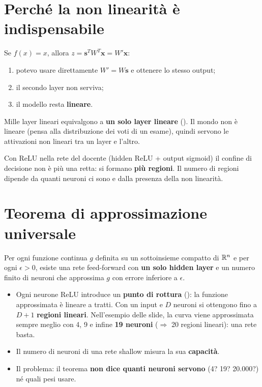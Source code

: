 \section{Perché la non linearità è indispensabile}
Se $f(x)=x$, allora $z = \mathbf{s}^T W^T \mathbf{x} = W'\mathbf{x}$:
\begin{enumerate}
  \item potevo usare direttamente $W' = W\mathbf{s}$ e ottenere lo stesso output;
  \item il secondo layer non serviva;
  \item il modello resta \textbf{lineare}.
\end{enumerate}
Mille layer lineari equivalgono a \textbf{un solo layer lineare} (). Il mondo non è lineare (pensa alla
distribuzione dei voti di un esame), quindi servono le attivazioni non lineari tra un layer e l'altro.

Con ReLU nella rete del docente (hidden ReLU + output sigmoid) il confine di decisione non è più una retta: si formano
\textbf{più regioni}. Il numero di regioni dipende da quanti neuroni ci sono e dalla presenza della non linearità.

\section{Teorema di approssimazione universale}
\begin{definizione}
Per ogni funzione continua $g$ definita su un sottoinsieme compatto di $\mathbb{R}^n$ e per ogni $\epsilon > 0$, esiste una
rete feed-forward con \textbf{un solo hidden layer} e un numero finito di neuroni che approssima $g$ con errore inferiore a $\epsilon$.
\end{definizione}
\begin{itemize}
  \item Ogni neurone ReLU introduce un \textbf{punto di rottura} (): la funzione approssimata è lineare a tratti.
        Con un input e $D$ neuroni si ottengono fino a $D+1$ \textbf{regioni lineari}. Nell'esempio delle slide, la curva viene
        approssimata sempre meglio con 4, 9 e infine \textbf{19 neuroni} ($\Rightarrow$ 20 regioni lineari): una rete
         basta.
  \item Il numero di neuroni di una rete shallow misura la sua \textbf{capacità}.
  \item Il problema: il teorema \textbf{non dice quanti neuroni servono} (4? 19? 20.000?) né quali pesi usare.
\end{itemize}

